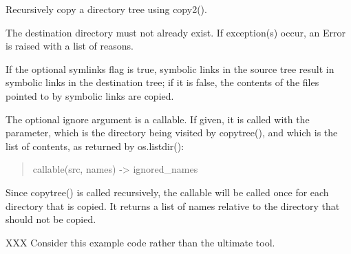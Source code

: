 \documentclass[letterpaper,10pt,english]{sphinxmanual}
\begin{document}

\begin{fulllineitems}
\label{\detokenize{pygace:pygace.utility.copytree}}
Recursively copy a directory tree using copy2().

The destination directory must not already exist.
If exception(s) occur, an Error is raised with a list of reasons.

If the optional symlinks flag is true, symbolic links in the
source tree result in symbolic links in the destination tree; if
it is false, the contents of the files pointed to by symbolic
links are copied.

The optional ignore argument is a callable. If given, it
is called with the  parameter, which is the directory
being visited by copytree(), and  which is the list of
 contents, as returned by os.listdir():
\begin{quote}

callable(src, names) -\textgreater{} ignored\_names
\end{quote}

Since copytree() is called recursively, the callable will be
called once for each directory that is copied. It returns a
list of names relative to the  directory that should
not be copied.

XXX Consider this example code rather than the ultimate tool.

\end{fulllineitems}

\end{document}
